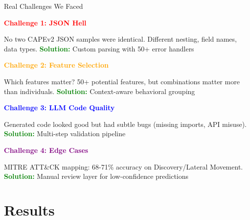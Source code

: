 \documentclass[11pt,aspectratio=16:9]{beamer}
\begin{document}
\begin{frame}{Real Challenges We Faced}
  \vspace{0.5cm}
  \begin{tcolorbox}[colback=red!5, colframe=red, boxrule=2pt]
    {\large \textbf{\textcolor{red}{Challenge 1: JSON Hell}}}
  \end{tcolorbox}
  {\small No two CAPEv2 JSON samples were identical. Different nesting, field names, data types.}
  \hfill \textcolor{green}{\textbf{Solution:}} Custom parsing with 50+ error handlers\\[0.3cm]
  
  \begin{tcolorbox}[colback=orange!5, colframe=orange, boxrule=2pt]
    {\large \textbf{\textcolor{orange}{Challenge 2: Feature Selection}}}
  \end{tcolorbox}
  {\small Which features matter? 50+ potential features, but combinations matter more than individuals.}
  \hfill \textcolor{green}{\textbf{Solution:}} Context-aware behavioral grouping\\[0.3cm]
  
  \begin{tcolorbox}[colback=blue!5, colframe=blue, boxrule=2pt]
    {\large \textbf{\textcolor{blue}{Challenge 3: LLM Code Quality}}}
  \end{tcolorbox}
  {\small Generated code looked good but had subtle bugs (missing imports, API misuse).}
  \hfill \textcolor{green}{\textbf{Solution:}} Multi-step validation pipeline\\[0.3cm]
  
  \begin{tcolorbox}[colback=purple!5, colframe=purple, boxrule=2pt]
    {\large \textbf{\textcolor{purple}{Challenge 4: Edge Cases}}}
  \end{tcolorbox}
  {\small MITRE ATT\&CK mapping: 68-71\% accuracy on Discovery/Lateral Movement.}
  \hfill \textcolor{green}{\textbf{Solution:}} Manual review layer for low-confidence predictions
\end{frame}

\section{Results}
\end{document}
